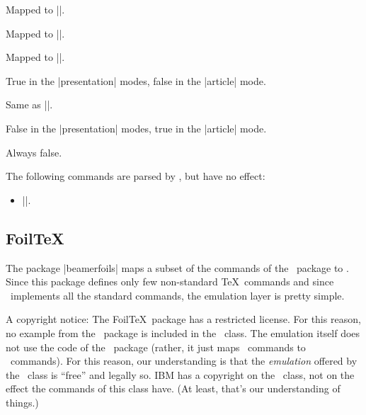 \begin{command}{\red}
  Mapped to |\color{red}|.
\end{command}

\begin{command}{\blue}
  Mapped to |\color{blue}|.
\end{command}

\begin{command}{\green}
  Mapped to |\color{green}|.
\end{command}

\begin{command}{\ifslide}
  True in the |presentation| modes, false in the |article| mode.
\end{command}

\begin{command}{\ifslidesonly}
  Same as |\ifslide|.
\end{command}

\begin{command}{\ifarticle}
  False in the |presentation| modes, true in the |article| mode.
\end{command}

\begin{command}{\ifportrait}
  Always false.
\end{command}

The following commands are parsed by \beamer, but have no effect:
\begin{itemize}\itemsep=0pt\parskip=0pt
\item |\ptsize|.
\end{itemize}


\subsection{Foil\TeX}
\label{section-foiltex}

The package |beamerfoils| maps a subset of the commands of the \foils\ package to \beamer. Since this package defines only few non-standard \TeX\ commands and since \beamer\ implements all the standard commands, the emulation layer is pretty simple.

A copyright notice: The Foil\TeX\ package has a restricted license. For this reason, no example from the \foils\ package is included in the \beamer\ class. The emulation itself does not use the code of the \foils\ package (rather, it just maps \foils\ commands to \beamer\ commands). For this reason, our understanding is that the \emph{emulation} offered by the \beamer\ class is ``free'' and legally so. IBM has a copyright on the \foils\ class, not on the effect the commands of this class have. (At least, that's our understanding of things.)

